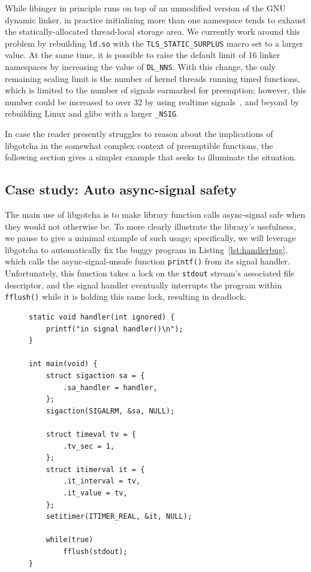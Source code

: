 \vspace{\parsep}
While libinger in principle runs on top of an unmodified version of the GNU dynamic
linker, in practice initializing more than one namespace tends to exhaust the
statically-allocated thread-local storage area.  We currently work around this
problem by rebuilding \texttt{ld.so} with the \texttt{TLS\_STATIC\_SURPLUS} macro set
to a larger value.  At the same time, it is possible to raise the default limit
of 16 linker namespaces by increasing the value of \texttt{DL\_NNS}.  With this
change, the only remaining scaling limit is the number of kernel threads running
timed functions, which is limited to the number of signals earmarked for preemption;
however, this number could be increased to over 32 by using realtime
signals~\cite{signal-manpage}, and beyond by rebuilding Linux and glibc with a larger
\texttt{\_NSIG}.

In case the reader presently struggles to reason about the implications of libgotcha
in the somewhat complex context of preemptible functions, the following section gives
a simpler example that seeks to illuminate the situation.

\subsection{Case study: Auto async-signal safety}
\label{sec:statefulness}

The main use of libgotcha is to make library function calls async-signal safe when
they would not otherwise be.  To more clearly illustrate the library's usefulness, we
pause to give a minimal example of such usage; specifically, we will leverage
libgotcha to automatically fix the buggy program in Listing~\ref{lst:handlerbug},
which calls the async-signal-unsafe function \texttt{printf()} from its signal
handler.  Unfortunately, this function takes a lock on the \texttt{stdout} stream's
associated file descriptor, and the signal handler eventually interrupts the program
within \texttt{fflush()} while it is holding this same lock, resulting in deadlock.

\begin{figure}
\begin{lstlisting}[label=lst:handlerbug,caption=C program with a buggy signal handler]
static void handler(int ignored) {
	printf("in signal handler()\n");
}

int main(void) {
	struct sigaction sa = {
		.sa_handler = handler,
	};
	sigaction(SIGALRM, &sa, NULL);

	struct timeval tv = {
		.tv_sec = 1,
	};
	struct itimerval it = {
		.it_interval = tv,
		.it_value = tv,
	};
	setitimer(ITIMER_REAL, &it, NULL);

	while(true)
		fflush(stdout);
}
\end{lstlisting}
\end{figure}

